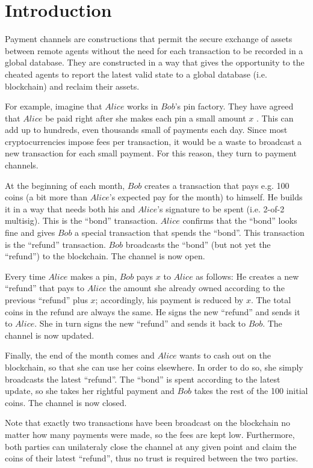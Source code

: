 \section{Introduction}
  Payment channels are constructions that permit the secure exchange of assets between
  remote agents without the need for each transaction to be recorded in a global database.
  They are constructed in a way that gives the opportunity to the cheated agents to report
  the latest valid state to a global database (i.e. blockchain) and reclaim their assets.

  For example, imagine that $Alice$ works in $Bob$'s pin factory. They have agreed that
  $Alice$ be paid right after she makes each pin a small amount $x$ \cite{bdevguide}. This
  can add up to hundreds, even thousands small of payments each day. Since most
  cryptocurrencies impose fees per transaction, it would be a waste to broadcast a new
  transaction for each small payment. For this reason, they turn to payment channels.

  At the beginning of each month, $Bob$ creates a transaction that pays e.g. 100 coins (a
  bit more than $Alice$'s expected pay for the month) to himself. He builds it in a way
  that needs both his and $Alice$'s signature to be spent (i.e. 2-of-2 multisig). This is
  the ``bond'' transaction. $Alice$ confirms that the ``bond'' looks fine and gives $Bob$
  a special transaction that spends the ``bond''. This transaction is the ``refund''
  transaction. $Bob$ broadcasts the ``bond'' (but not yet the ``refund'') to the
  blockchain. The channel is now open.

  Every time $Alice$ makes a pin, $Bob$ pays $x$ to $Alice$ as follows: He creates a new
  ``refund'' that pays to $Alice$ the amount she already owned according to the previous
  ``refund'' plus $x$; accordingly, his payment is reduced by $x$. The total coins in
  the refund are always the same. He signs the new ``refund'' and sends it to $Alice$. She
  in turn signs the new ``refund'' and sends it back to $Bob$. The channel is now updated.

  Finally, the end of the month comes and $Alice$ wants to cash out on the blockchain, so
  that she can use her coins elsewhere. In order to do so, she simply broadcasts the
  latest ``refund''. The ``bond'' is spent according to the latest update, so she takes
  her rightful payment and $Bob$ takes the rest of the 100 initial coins. The channel is
  now closed.

  Note that exactly two transactions have been broadcast on the blockchain no matter how
  many payments were made, so the fees are kept low. Furthermore, both parties can
  unilateraly close the channel at any given point and claim the coins of their latest
  ``refund'', thus no trust is required between the two parties.


